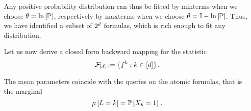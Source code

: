 Any positive probability distribution can thus be fitted by minterms when we choose $\theta=\ln \left[ \mathbb{P} \right]$, respectively by maxterms when we choose $\theta=\mathbb{I}-\ln \left[ \mathbb{P} \right]$.
Thus, we have identified a subset of $2^{d}$ formulas, which is rich enough to fit any distribution.






Let us now derive a closed form backward mapping for the statistic
\[ \mathcal{F}_{[d]} := \{f^{k}: k\in[d]\} \, . \]

The mean parameters coincide with the queries on the atomic formulas, that is the marginal
\[ \mu\left[L=k\right] = \mathbb{P}\left[X_{k}=1\right]  \, . \]

